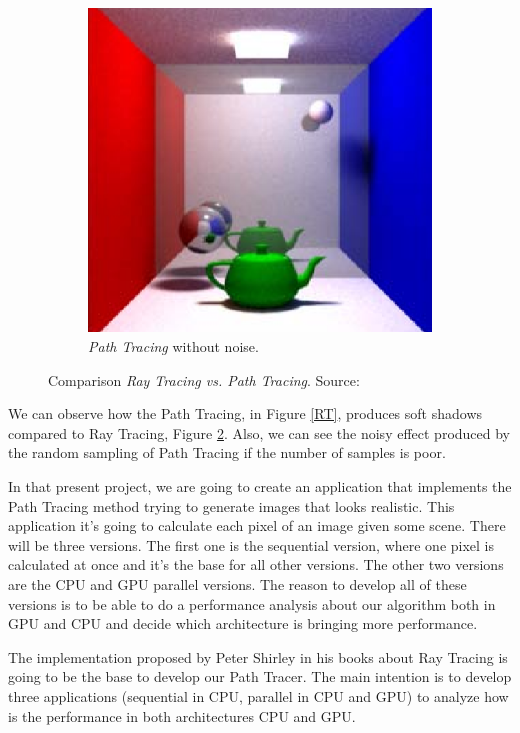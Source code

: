 \documentclass[titlepage,12pt]{article}
\begin{document}
\begin{figure}[H]
\begin{subfigure}{.3\textwidth}
		\includegraphics[width=.8\textwidth]{media/PathTracingMD.png}	
		\caption{\textit{Path Tracing} without noise.}
		\label{PT}
	\end{subfigure}
	\caption{Comparison \textit{Ray Tracing vs. Path Tracing}. Source: \citep[pp.~23--29]{Cassagnabere2004}}
\end{figure}

We can observe how the Path Tracing, in Figure \ref{RT}, produces soft shadows compared to Ray Tracing, Figure \ref{PT}. Also, we can see the noisy effect produced by the random sampling of Path Tracing if the number of samples is poor.

In that present project, we are going to create an application that implements the Path Tracing method trying to generate images that looks realistic. This application it's going to calculate each pixel of an image given some scene. There will be three versions. The first one is the sequential version, where one pixel is calculated at once and it's the base for all other versions. The other two versions are the CPU and GPU parallel versions. The reason to develop all of these versions is to be able to do a performance analysis about our algorithm both in GPU and CPU and decide which architecture is bringing more performance.

The implementation proposed by Peter Shirley in his books about Ray Tracing  \citep{ShirleyRTA, ShirleyRTB, ShirleyRTC} is going to be the base to develop our Path Tracer. The main intention is to develop three applications (sequential in CPU, parallel in CPU and GPU) to analyze how is the performance in both architectures CPU and GPU.
\end{document}
